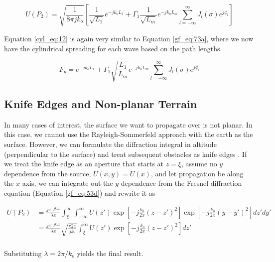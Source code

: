 \begin{equation}
\boxed{U(P_2) = \sqrt{\frac{1}{8\pi j k_o}}\left[\frac{1}{\sqrt{L_1}} e^{-jk_oL_1}+\Gamma_1\frac{1}{\sqrt{L_m}} e^{-jk_oL_m} \sum_{l=-\infty}^{\infty}J_l(\sigma)e^{j\phi_l}\right]}
\label{cyl_eq:12}
\end{equation}
\renewcommand{\baselinestretch}{2} \small\normalsize

Equation \ref{cyl_eq:12} is again very similar to Equation \ref{gf_eq:73a}, where we now have the cylindrical spreading for each wave based on the path lengths.

\begin{equation}
F_p =e^{-jk_oL_1}+\Gamma_1\sqrt{\frac{L_1}{L_m}} e^{-jk_oL_m} \sum_{l=-\infty}^{\infty}J_l(\sigma)e^{j\phi_l}
\label{cyl_eq:13}
\end{equation}
\renewcommand{\baselinestretch}{2} \small\normalsize

\subsection {Knife Edges and Non-planar Terrain}
In many cases of interest, the surface we want to propagate over is not planar. In this case, we cannot use the Rayleigh-Sommerfeld approach with the earth as the surface. However, we can formulate the diffraction integral in altitude (perpendicular to the surface) and treat subsequent obstacles as knife edges \cite{whitteker_diffraction}. If we treat the knife edge as an aperture that starts at $z=\xi$, assume no $y$ dependence from the source, $U(x,y) = U(x)$, and let propagation be along the $x$ axis, we can integrate out the $y$ dependence from the Fresnel diffraction equation (Equation \ref{gf_eq:53d}) and rewrite it as 

\begin{equation}
\begin{aligned}
U(P_2) &=\frac{je^{-jk_ox}}{\lambda x}\int_{\xi}^{\infty}\int_{-\infty}^{\infty} U(z') \exp\left[-j \frac{k_o}{2x}\left(z-z'\right)^2 \right]   \exp\left[-j \frac{k_o}{2x}\left(y-y'\right)^2 \right]dz' dy' \\
&=\frac{je^{-jk_ox}}{\lambda x}\sqrt{\frac{\pi 2 x}{jk_o}}\int_{\xi}^{\infty}U(z') \exp\left[-j \frac{k_o}{2x}\left(z-z'\right)^2 \right]dz'\\
\end{aligned}
\label{gf_eq:82}
\end{equation}
\renewcommand{\baselinestretch}{2} \small\normalsize

\noindent Substituting $\lambda = 2\pi/k_o$ yields the final result.

